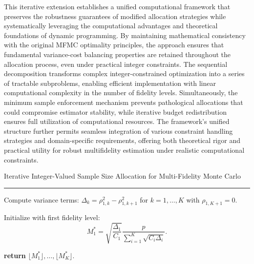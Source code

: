 
This iterative extension establishes a unified computational framework that preserves the robustness guarantees of modified allocation strategies while systematically leveraging the computational advantages and theoretical foundations of dynamic programming. By maintaining mathematical consistency with the original MFMC optimality principles, the approach ensures that fundamental variance-cost balancing properties are retained throughout the allocation process, even under practical integer constraints. The sequential decomposition transforms complex integer-constrained optimization into a series of tractable subproblems, enabling efficient implementation with linear computational complexity in the number of fidelity levels. Simultaneously, the minimum sample enforcement mechanism prevents pathological allocations that could compromise estimator stability, while iterative budget redistribution ensures full utilization of computational resources. The framework's unified structure further permits seamless integration of various constraint handling strategies and domain-specific requirements, offering both theoretical rigor and practical utility for robust multifidelity estimation under realistic computational constraints.


\begin{algorithm}[!ht]
\caption{Iterative Integer-Valued Sample Size Allocation for Multi-Fidelity Monte Carlo}
\label{algo:Iterative_MFMC_Algo}
\DontPrintSemicolon

\hrule\vspace{1ex}


Compute variance terms: $\Delta_k = \rho_{1,k}^2 - \rho_{1,k+1}^2$ for $k = 1, \dots, K$ with $\rho_{1,K+1}=0$.


Initialize with first fidelity level:
\[
M_1^* = \sqrt{\frac{\Delta_1}{C_1}} \frac{p}{ \sum_{i=1}^K \sqrt{C_i \Delta_i}}.
\]


\textbf{return} $\lfloor M_1^* \rfloor, \dots, \lfloor M_K^* \rfloor$.
\end{algorithm}



